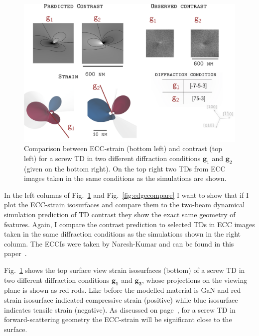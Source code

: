 \begin{figure}[ht]
    \centering
    \includegraphics[width=0.8\linewidth]{Figures/screwcompare.png}
    \caption[ECC-strain vs contrast for a screw TD]{  Comparison between ECC-strain (bottom left) and contrast (top left) for a screw TD in two different diffraction conditions $\textbf{g}_1$ and $\textbf{g}_2$ (given on the bottom right). On the top right two TDs from ECC images taken in the same conditions as the simulations are shown.}
    \label{fig:screwcompare}
\end{figure}


In the left columns of Fig.~\ref{fig:screwcompare} and Fig.~\ref{fig:edgecompare} I want to show that if I plot the ECC-strain isosurfaces and compare them to the two-beam dynamical simulation prediction of TD contrast they show the exact same geometry of features.  Again, I compare the contrast prediction to selected TDs in ECC images taken in the same diffraction conditions as the simulations shown in the right column.  The ECCIs were taken by Naresh-Kumar and can be found in this paper~\cite{Naresh}.



Fig.~\ref{fig:screwcompare} shows the top surface view strain isosurfaces (bottom) of a screw TD in two different diffraction conditions $\mathbf{g_1}$ and $\mathbf{g_2}$, whose projections on the viewing plane is shown as red rods. Like before the modelled material is \hkl[001] GaN and red strain isosurface indicated compressive strain (positive) while blue isosurface indicates tensile strain (negative). As discussed on page~\pageref{fig:edge}, for a screw TD in forward-scattering geometry the ECC-strain will be significant close to the surface. 

